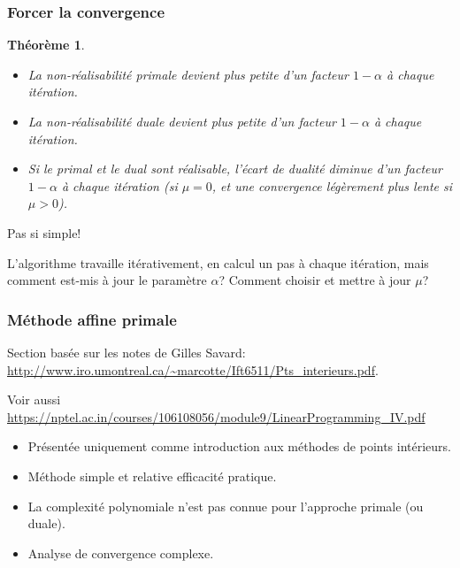 \documentclass[t,usepdftitle=false]{beamer}
\newtheorem{thm}{Théorème}
\begin{document}
\begin{frame}
\frametitle{Forcer la convergence}

\begin{thm}
\begin{itemize}
\item
La non-réalisabilité primale devient plus petite d'un facteur $1 - \alpha$ à chaque itération.
\item
La non-réalisabilité duale devient plus petite d'un facteur $1 - \alpha$ à chaque itération.
\item
Si le primal et le dual sont réalisable, l'écart de dualité diminue d'un facteur $1-\alpha$ à chaque itération (si $\mu = 0$, et une convergence légèrement plus lente si $\mu > 0$).
\end{itemize}
\end{thm}


Pas si simple!

\mbox{}

L'algorithme travaille itérativement, en calcul un pas à chaque itération, mais comment est-mis à jour le paramètre $\alpha$? Comment choisir et mettre à jour $\mu$?

\end{frame}

\begin{frame}
	\frametitle{Méthode affine primale}
	
	Section basée sur les notes de Gilles Savard: \url{http://www.iro.umontreal.ca/~marcotte/Ift6511/Pts_interieurs.pdf}.
	
	Voir aussi \url{https://nptel.ac.in/courses/106108056/module9/LinearProgramming_IV.pdf}

\mbox{}
	
	\begin{itemize}
		\item 
		Présentée uniquement comme introduction aux méthodes de points intérieurs.
		\item
		Méthode simple et relative efficacité pratique.
		\item
		La complexité polynomiale n’est pas connue pour l'approche primale (ou duale).
		\item
		Analyse de convergence complexe.
	\end{itemize}
	
\end{frame}
\end{document}
